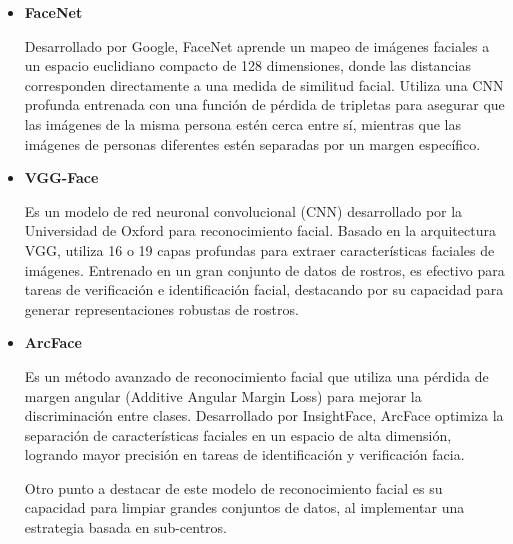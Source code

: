 \begin{itemize}
	
	\item \textbf{FaceNet}
	
	Desarrollado por Google, FaceNet aprende un mapeo de imágenes faciales a un espacio euclidiano compacto de 128 dimensiones, donde las distancias corresponden directamente a una medida de similitud facial. Utiliza una CNN profunda entrenada con una función de pérdida de tripletas para asegurar que las imágenes de la misma persona estén cerca entre sí, mientras que las imágenes de personas diferentes estén separadas por un margen específico.
	
	\item \textbf{VGG-Face}
	
	Es un modelo de red neuronal convolucional (CNN) desarrollado por la Universidad de Oxford para reconocimiento facial. Basado en la arquitectura VGG, utiliza 16 o 19 capas profundas para extraer características faciales de imágenes. Entrenado en un gran conjunto de datos de rostros, es efectivo para tareas de verificación e identificación facial, destacando por su capacidad para generar representaciones robustas de rostros.
	
	\item \textbf{ArcFace}
	
	Es un método avanzado de reconocimiento facial que utiliza una pérdida de margen angular (Additive Angular Margin Loss) para mejorar la discriminación entre clases. Desarrollado por InsightFace, ArcFace optimiza la separación de características faciales en un espacio de alta dimensión, logrando mayor precisión en tareas de identificación y verificación facia.
	
	Otro punto a destacar de este modelo de reconocimiento facial es su capacidad para limpiar grandes conjuntos de datos, al implementar una estrategia basada en sub-centros. 

\end{itemize}

